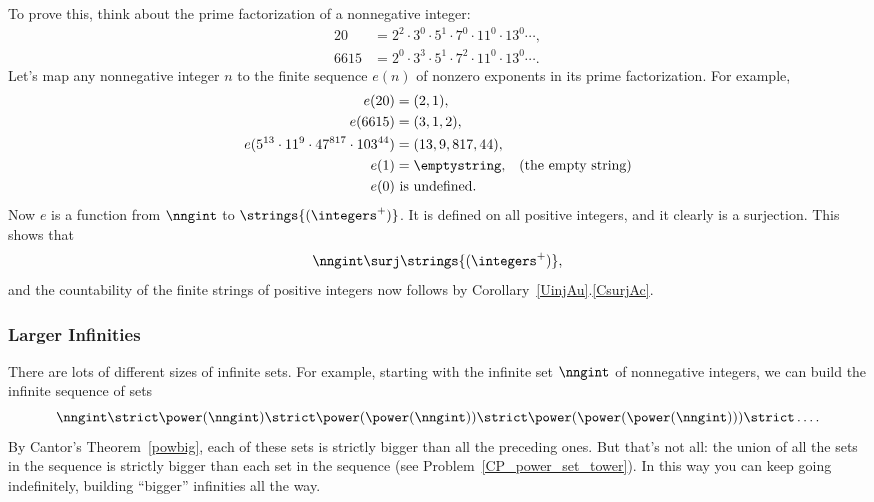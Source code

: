 To prove this, think about the prime factorization of a nonnegative
integer:
\begin{align*}
20 & = 2^2 \cdot 3^0 \cdot 5^1 \cdot 7^0 \cdot 11^0\cdot 13^0 \cdots,\\
6615 & = 2^0 \cdot 3^3 \cdot 5^1 \cdot 7^2 \cdot 11^0\cdot 13^0 \cdots.
\end{align*}
Let's map any nonnegative integer $n$ to the finite sequence $e(n)$ of
nonzero exponents in its prime factorization.  For example,
\begin{align*}
e(20) & = (2,1),\\
e(6615) & = (3,1,2),\\
e(5^{13} \cdot 11^{9} \cdot 47^{817} \cdot 103^{44}) & = (13, 9, 817, 44),\\
e(1) & = \emptystring, & \text{(the empty string)}\\
e(0) & \text{ is undefined}.
\end{align*}
Now $e$ is a function from $\nngint$ to $\strings{(\integers^{+})}$.  It
is defined on all positive integers, and it clearly is a surjection.  This
shows that
\[
\nngint \surj \strings{(\integers^{+})},
\]
and the countability of the finite strings of positive integers now
follows by Corollary~\ref{UinjAu}.\eqref{CsurjAc}.

\iffalse
To prove this, think about putting a decimal point in front of an
infinite bit string to get the decimal expansion of some real number.
That is, putting a decimal point at the beginning of a bit string
defines a function $p:\binw \to \reals$.  For example,
\[
p(000\dots) = .000\dots = 0, \qquad p(1000\dots) = .1000\dots = 1/10,\qquad
p(010101\dots) = .010101\dots = 1/99, \qquad p(11111\dots) = .1111\dots = 1/9\, .
\]
In fact, $p$ is a total function ranging from 0 to 1/9.  Moreover, $p$
is an injection: if two bit strings $s,t \binw$ differ anywhere in
their first $n$ bits, then $p(s)$ and $p(t)$ differ by at least
$8/(9\cdot 10^{n+1})$---a fact which it may amuse you to verify.  This
shows that
\[
\binw \inj \reals.
\]
\fi

\subsubsection{Larger Infinities}

There are lots of different sizes of infinite sets.  For example,
starting with the infinite set $\nngint$ of nonnegative integers,
we can build the infinite sequence of sets
\[
\nngint \strict \power(\nngint) \strict \power(\power(\nngint))
\strict \power(\power(\power(\nngint))) \strict \dots.
\]
By Cantor's Theorem~\ref{powbig}, each of these sets is strictly
bigger than all the preceding ones.  But that's not all: the union of
all the sets in the sequence is strictly bigger than each set in the
sequence (see Problem~\ref{CP_power_set_tower}).  In this way you can
keep going indefinitely, building ``bigger'' infinities all the way.

